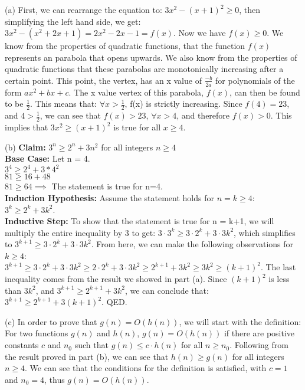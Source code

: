 \documentclass[11pt]{article}
\begin{document}
\begin{solution}
\begin{description}

\item{(a)} First, we can rearrange the equation to: $3x^2 - (x+1)^2 \ge 0$, then simplifying the left hand side, we get: $3x^2 - (x^2 + 2x + 1) = 2x^2 - 2x - 1 = f(x)$. Now we have $f(x) \ge 0$. We know from the properties of quadratic functions, that the function $f(x)$ represents an parabola that opens upwards. We also know from the properties of quadratic functions that these parabolas are monotonically increasing after a certain point. This point, the vertex, has an x value of $\frac{-b}{2a}$ for polynomials of the form $ax^2 + bx + c$. The x value vertex of this parabola, $f(x)$, can then be found to be $\frac{1}{2}$. This means that: $\forall x > \frac{1}{2}$, f(x) is strictly increasing. Since $f(4) = 23$, and $4 > \frac{1}{2}$, we can see that $f(x) > 23$, $\forall x > 4$, and therefore $f(x) > 0$. This implies that $3x^2 \geq (x + 1)^2$ is true for all $ x \ge 4$.

\item{(b)} \textbf{Claim:} $3^n \ge 2^{n} + 3n^2$ for all integers $n\ge 4$
\\ \textbf{Base Case:} Let n = 4. 
\\ $3^4 \ge 2^4 + 3*4^2$
\\ $81 \ge 16 + 48$
\\ $81 \ge 64 \implies$ The statement is true for n=4.
\\ \textbf{Induction Hypothesis:} Assume the statement holds for $n=k \ge 4$: $3^k \ge 2^{k} + 3k^2$.
\\ \textbf{Inductive Step:} To show that the statement is true for n = k+1, we will multiply the entire inequality by 3 to get: $3\cdot3^k \ge 3\cdot2^{k} + 3\cdot3k^2$, which simplifies to $3^{k+1} \ge 3\cdot2^{k} + 3\cdot3k^2$. From here, we can make the following observations for $k \ge 4$:
\\ $3^{k+1} \ge 3\cdot2^{k} + 3\cdot3k^2 \ge 2\cdot2^k + 3 \cdot 3k^2 \ge 2^{k+1} + 3k^2 \ge 3k^2 \ge (k+1)^2$. The last inequality comes from the result we showed in part (a). Since $(k+1)^2$ is less than $3k^2$, and $3^{k+1} \ge 2^{k+1} + 3k^2$, we can conclude that: $3^{k+1} \ge 2^{k+1} + 3(k+1)^2$. QED.

\item {(c)} In order to prove that $g(n) = O(h(n))$, we will start with the definition: For two functions $g(n)$ and $h(n)$, $g(n) = O(h(n))$ if there are positive constants $c$ and $n_0$ such that $g(n) \le c \cdot h(n)$ for all $n \ge n_0$. Following from the result proved in part (b), we can see that $h(n) \ge g(n)$ for all integers $n \ge 4$. We can see that the conditions for the definition is satisfied, with $c=1$ and $n_0=4$, thus $g(n) = O(h(n))$.

\end{description}
\end{solution}
\end{document}
